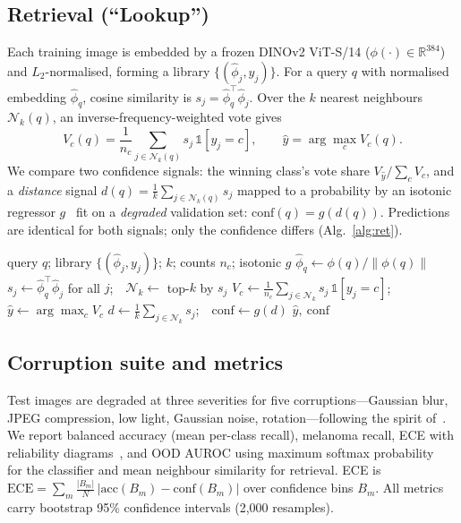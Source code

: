 \documentclass[conference]{IEEEtran}
\begin{document}
\subsection{Retrieval (``Lookup'')}
Each training image is embedded by a frozen DINOv2 ViT-S/14
($\phi(\cdot)\in\mathbb{R}^{384}$)~\cite{oquab2024} and $L_2$-normalised, forming
a library $\{(\hat\phi_j,y_j)\}$. For a query $q$ with normalised embedding
$\hat\phi_q$, cosine similarity is $s_j=\hat\phi_q^\top\hat\phi_j$. Over the
$k$ nearest neighbours $\mathcal{N}_k(q)$, an inverse-frequency-weighted vote
gives
\begin{equation}
V_c(q)=\frac{1}{n_c}\!\!\sum_{j\in\mathcal{N}_k(q)}\!\! s_j\,\mathbb{1}[y_j=c],
\qquad \hat y=\arg\max_c V_c(q).
\end{equation}
We compare two confidence signals: the winning class's vote share
$V_{\hat y}/\sum_c V_c$, and a \emph{distance} signal
$d(q)=\tfrac{1}{k}\sum_{j\in\mathcal{N}_k(q)} s_j$ mapped to a probability by an
isotonic regressor $g$~\cite{zadrozny2002} fit on a \emph{degraded} validation
set: $\mathrm{conf}(q)=g(d(q))$. Predictions are identical for both signals;
only the confidence differs (Alg.~\ref{alg:ret}).

\begin{algorithm}[t]
\caption{Retrieval classification with distance confidence}
\label{alg:ret}
\begin{algorithmic}[1]
\Require query $q$; library $\{(\hat\phi_j,y_j)\}$; $k$; counts $n_c$; isotonic $g$
\State $\hat\phi_q \gets \phi(q)/\lVert\phi(q)\rVert$
\State $s_j \gets \hat\phi_q^\top\hat\phi_j$ for all $j$;\ \ $\mathcal{N}_k \gets$ top-$k$ by $s_j$
\State $V_c \gets \frac{1}{n_c}\sum_{j\in\mathcal{N}_k} s_j\,\mathbb{1}[y_j{=}c]$;\ \ $\hat y \gets \arg\max_c V_c$
\State $d \gets \frac{1}{k}\sum_{j\in\mathcal{N}_k} s_j$;\ \ $\mathrm{conf}\gets g(d)$
\State \Return $\hat y,\ \mathrm{conf}$
\end{algorithmic}
\end{algorithm}

\subsection{Corruption suite and metrics}
Test images are degraded at three severities for five corruptions---Gaussian
blur, JPEG compression, low light, Gaussian noise, rotation---following the
spirit of~\cite{hendrycks2019}. We report balanced accuracy (mean per-class
recall), melanoma recall, ECE with reliability diagrams~\cite{guo2017,naeini2015},
and OOD AUROC using maximum softmax probability~\cite{hendrycks2017} for the
classifier and mean neighbour similarity for retrieval. ECE is
$\mathrm{ECE}=\sum_{m}\frac{|B_m|}{N}\,\lvert\mathrm{acc}(B_m)-\mathrm{conf}(B_m)\rvert$
over confidence bins $B_m$. All metrics carry bootstrap 95\% confidence
intervals (2{,}000 resamples).
\end{document}
